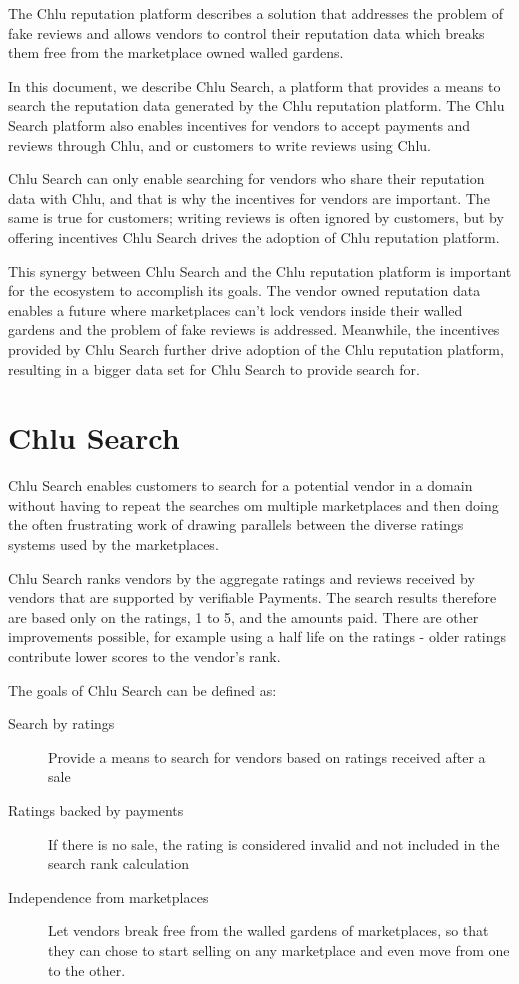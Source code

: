 \documentclass[a4paper]{article}
\begin{document}
The Chlu reputation platform\cite{chlu-reputation} describes a
solution that addresses the problem of fake reviews and allows vendors
to control their reputation data which breaks them free from the
marketplace owned walled gardens.

In this document, we describe Chlu Search, a platform that provides a
means to search the reputation data generated by the Chlu reputation
platform. The Chlu Search platform also enables incentives for vendors
to accept payments and reviews through Chlu, and or customers to write
reviews using Chlu.

Chlu Search can only enable searching for vendors who share their
reputation data with Chlu, and that is why the incentives for vendors
are important. The same is true for customers; writing reviews is
often ignored by customers, but by offering incentives Chlu Search
drives the adoption of Chlu reputation platform.

This synergy between Chlu Search and the Chlu reputation platform is
important for the ecosystem to accomplish its goals. The vendor owned
reputation data enables a future where marketplaces can't lock vendors
inside their walled gardens and the problem of fake reviews is
addressed. Meanwhile, the incentives provided by Chlu Search further
drive adoption of the Chlu reputation platform, resulting in a bigger
data set for Chlu Search to provide search for.

\section{Chlu Search}

Chlu Search enables customers to search for a potential vendor in a
domain without having to repeat the searches om multiple marketplaces
and then doing the often frustrating work of drawing parallels between
the diverse ratings systems used by the marketplaces.

Chlu Search ranks vendors by the aggregate ratings and reviews
received by vendors that are supported by verifiable Payments. The
search results therefore are based only on the ratings, 1 to 5, and
the amounts paid. There are other improvements possible, for example
using a half life on the ratings - older ratings contribute lower
scores to the vendor's rank.

The goals of Chlu Search can be defined as:

\begin{description}
\item[Search by ratings] Provide a means to search for vendors based
  on ratings received after a sale
\item[Ratings backed by payments] If there is no sale, the rating is
  considered invalid and not included in the search rank calculation
\item[Independence from marketplaces] Let vendors break free from the
  walled gardens of marketplaces, so that they can chose to start
  selling on any marketplace and even move from one to the other.
\end{description}
\end{document}
